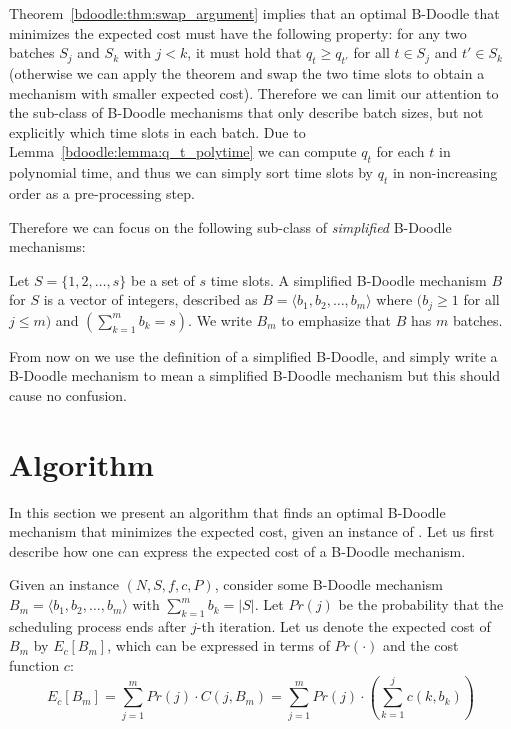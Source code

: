 Theorem~\ref{bdoodle:thm:swap_argument} implies that an optimal B-Doodle that minimizes the expected cost must have the following property: for any two batches $S_j$ and $S_k$ with $j < k$, it must hold that $q_t \geq q_{t'}$ for all $t\in S_j$ and $t' \in S_k$ (otherwise we can apply the theorem and swap the two time slots to obtain a mechanism with smaller expected cost).
Therefore we can limit our attention to the sub-class of B-Doodle mechanisms that only describe batch sizes, but not explicitly which time slots in each batch. Due to Lemma~\ref{bdoodle:lemma:q_t_polytime} we can compute $q_t$ for each $t$ in polynomial time, and thus we can simply sort time slots by $q_t$ in non-increasing order as a pre-processing step.

Therefore we can focus on the following sub-class of \emph{simplified} B-Doodle mechanisms:
\begin{definition}
Let $S = \{1, 2, \dots, s\}$ be a set of $s$ time slots. 
A simplified B-Doodle mechanism $B$ for $S$ is a vector of integers, described as $B = \langle b_1, b_2, \dots, b_m\rangle$ where $(b_j \geq 1$ for all $j \leq m)$ and $(\sum_{k=1}^{m} b_k = s)$.
We write $B_m$ to emphasize that $B$ has $m$ batches.
\end{definition}
From now on we use the definition of a simplified B-Doodle, and simply write a B-Doodle mechanism to mean a simplified B-Doodle mechanism but this should cause no confusion.






\section{Algorithm} \label{bdoodle:sec:Algorithm}

In this section we present an algorithm that finds an optimal B-Doodle mechanism that minimizes the expected cost, given an instance of \BDP. Let us first describe how one can express the expected cost of a B-Doodle mechanism. 

Given an instance $(N, S, f, c, P)$, consider some B-Doodle mechanism $B_{m} = \langle b_1, b_2, \dots, b_m \rangle$ with $\sum_{k=1}^{m} b_k = |S|$. Let $Pr(j)$ be the probability that the scheduling process ends after $j$-th iteration. Let us denote the expected cost of $B_{m}$ by $E_c[B_{m}]$, which can be expressed in terms of $Pr(\cdot)$ and the cost function $c$:
\begin{equation} \label{bdoodle:eqn:expCost}
	E_c[B_{m}] = \sum_{j=1}^{m} Pr(j) \cdot C(j, B_{m})  =  \sum_{j=1}^{m} Pr(j) \cdot \left(\sum_{k=1}^{j} c(k, b_k)\right)
\end{equation}%

